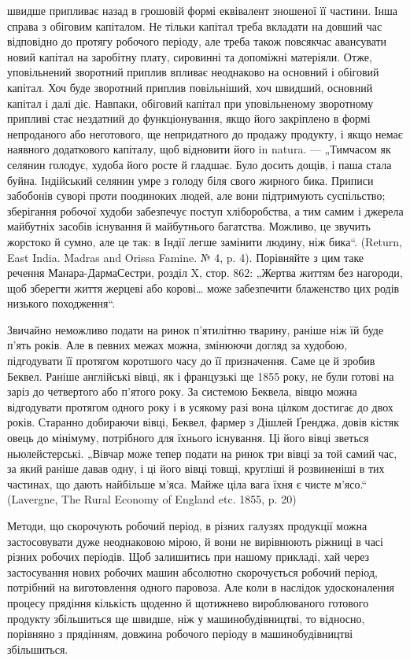 \parcont{}  %
швидше припливає назад в грошовій формі еквівалент зношеної її частини.
Інша справа з обіговим капіталом. Не тільки капітал треба вкладати на
довший час відповідно до протягу робочого періоду, але треба також
повсякчас авансувати новий капітал на заробітну плату, сировинні та
допоміжні матеріяли. Отже, уповільнений зворотний приплив впливає
неоднаково на основний і обіговий капітал. Хоч буде зворотний приплив
повільніший, хоч швидший, основний капітал і далі діє. Навпаки, обіговий
капітал при уповільненому зворотному припливі стає нездатний до функціонування,
якщо його закріплено в формі непроданого або неготового,
ще непридатного до продажу продукту, і якщо немає наявного додаткового
капіталу, щоб відновити його in natura. — „Тимчасом як селянин
голодує, худоба його росте й гладшає. Було досить дощів, і паша стала
буйна. Індійський селянин умре з голоду біля свого жирного бика. Приписи
забобонів суворі проти поодиноких людей, але вони підтримують
суспільство; зберігання робочої худоби забезпечує поступ хліборобства,
а тим самим і джерела майбутніх засобів існування й майбутнього багатства.
Можливо, це звучить жорстоко й сумно, але це так: в Індії легше
замінити людину, ніж бика“. (Return, East India. Madras and Orissa
Famine. № 4, p. 4). Порівняйте з цим таке речення Манара-ДармаСестри,
розділ X, стор. 862: „Жертва життям без нагороди, щоб зберегти
життя жерцеві або корові\dots{} може забезпечити блаженство цих
родів низького походження“.

Звичайно неможливо подати на ринок п’ятилітню тварину, раніше
ніж їй буде п’ять років. Але в певних межах можна, змінюючи догляд
за худобою, підгодувати її протягом коротшого часу до її призначення.
Саме це й зробив Беквел. Раніше англійські вівці, як і французькі ще
1855 року, не були готові на заріз до четвертого або п’ятого року. За
системою Беквела, вівцю можна відгодувати протягом одного року і в
усякому разі вона цілком достигає до двох років. Старанно добираючи вівці,
Беквел, фармер з Дішлей Ґренджа, довів кістяк овець до мінімуму, потрібного
для їхнього існування. Ці його вівці зветься ньюлейстерські.
„Вівчар може тепер подати на ринок три вівці за той самий час, за який
раніше давав одну, і ці його вівці товщі, кругліші й розвиненіші
в тих частинах, що дають найбільше м’яса. Майже ціла вага їхня є чисте
м’ясо.“ (Lavergne, The Rural Economy of England etc. 1855, p. 20)

Методи, що скорочують робочий період, в різних галузях продукції
можна застосовувати дуже неоднаковою мірою, й вони не вирівнюють
ріжниці в часі різних робочих періодів. Щоб залишитись при нашому
прикладі, хай через застосування нових робочих машин абсолютно скорочується
робочий період, потрібний на виготовлення одного паровоза.
Але коли в наслідок удосконалення процесу прядіння кількість щоденно
й щотижнево вироблюваного готового продукту збільшиться ще швидше,
ніж у машинобудівництві, то відносно, порівняно з прядінням, довжина
робочого періоду в машинобудівництві збільшиться.

